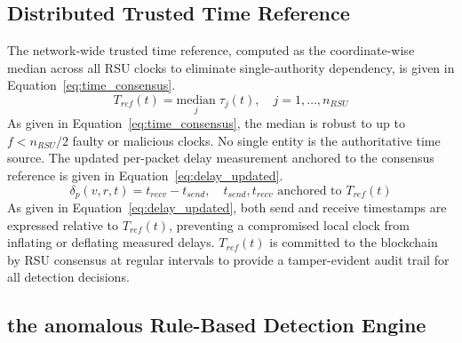 \documentclass[12pt, a4paper]{report}
\begin{document}
\subsection{Distributed Trusted Time Reference}
\label{sec:time_ref}

The network-wide trusted time reference, computed as the
coordinate-wise median across all \ac{RSU} clocks to
eliminate single-authority dependency, is given in
Equation~\eqref{eq:time_consensus}.
\begin{equation}
T_{ref}(t)=\underset{j}{\text{median}}\;\tau_j(t),
\quad j=1,\ldots,n_{RSU}
\label{eq:time_consensus}
\end{equation}
As given in Equation~\eqref{eq:time_consensus}, the
median is robust to up to $f{<}n_{RSU}/2$ faulty or
malicious clocks. No single entity is the authoritative
time source.
The updated per-packet delay measurement anchored to
the consensus reference is given in
Equation~\eqref{eq:delay_updated}.
\begin{equation}
\delta_p(v,r,t)=t_{recv}-t_{send},\quad
t_{send},t_{recv}\text{ anchored to }T_{ref}(t)
\label{eq:delay_updated}
\end{equation}
As given in Equation~\eqref{eq:delay_updated}, both
send and receive timestamps are expressed relative to
$T_{ref}(t)$, preventing a compromised local clock from
inflating or deflating measured delays. $T_{ref}(t)$ is
committed to the blockchain by \ac{RSU} consensus at
regular intervals to provide a tamper-evident audit
trail for all detection decisions.

\subsection{the anomalous Rule-Based Detection Engine}
\label{sec:rule_based}
\end{document}
